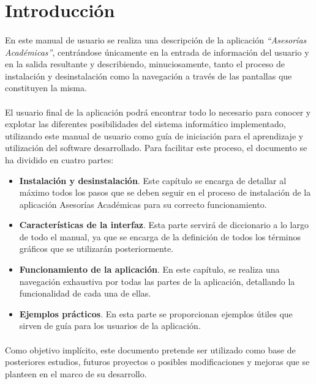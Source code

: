 \section{Introducción}

  \paragraph{}En este manual de usuario se realiza una descripción de la
  aplicación \textit{``Asesorías Académicas''}, centrándose únicamente en la
  entrada de información del usuario y en la salida resultante y describiendo,
  minuciosamente, tanto el proceso de instalación y desinstalación como la
  navegación a través de las pantallas que constituyen la misma.

  \paragraph{}El usuario final de la aplicación podrá encontrar todo lo
  necesario para conocer y explotar las diferentes posibilidades del sistema
  informático implementado, utilizando este manual de usuario como guía de
  iniciación para el aprendizaje y utilización del software desarrollado. Para
  facilitar este proceso, el documento se ha dividido en cuatro partes:

  \begin{itemize}
    \item \textbf{Instalación y desinstalación}. Este capítulo se encarga de
    detallar al máximo todos los pasos que se deben seguir en el proceso de
    instalación de la aplicación Asesorías Académicas para su correcto
    funcionamiento.
    \item \textbf{Características de la interfaz}. Esta parte servirá de
    diccionario a lo largo de todo el manual, ya que se encarga de la definición
    de todos los términos gráficos que se utilizarán posteriormente.
    \item \textbf{Funcionamiento de la aplicación}. En este capítulo, se
    realiza una navegación exhaustiva por todas las partes de la aplicación,
    detallando la funcionalidad de cada una de ellas.
    \item \textbf{Ejemplos prácticos}. En esta parte se proporcionan ejemplos
    útiles que sirven de guía para los usuarios de la aplicación.
  \end{itemize}

  \paragraph{}Como objetivo implícito, este documento pretende ser utilizado
  como base de posteriores estudios, futuros proyectos o posibles modificaciones
  y mejoras que se planteen en el marco de su desarrollo.
